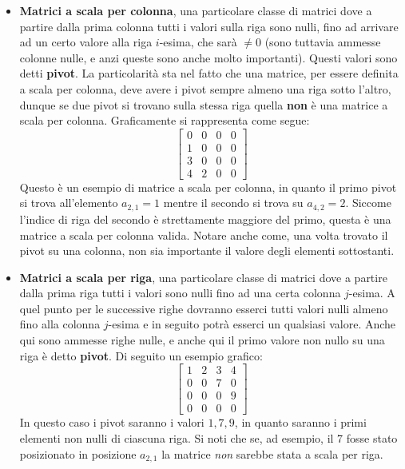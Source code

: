 \documentclass[12pt]{report}
\begin{document}
	\begin{itemize}
		\item \textbf{Matrici a scala per colonna}, una particolare classe di matrici dove a partire dalla prima colonna tutti i valori sulla riga sono nulli, fino ad arrivare ad un certo valore alla riga $i$-esima, che sarà $\neq 0$ (sono tuttavia ammesse colonne nulle, e anzi queste sono anche molto importanti). Questi valori sono detti \textbf{pivot}.
		La particolarità sta nel fatto che una matrice, per essere definita a scala per colonna, deve avere i pivot sempre almeno una riga sotto l'altro, dunque se due pivot si trovano sulla stessa riga quella \textbf{non} è una matrice a scala per colonna.
		Graficamente si rappresenta come segue:
		\[
			\begin{bmatrix}
				0 & 0 & 0 & 0\\
				1 & 0 & 0 & 0\\
				3 & 0 & 0 & 0\\
				4 & 2 & 0 & 0
			\end{bmatrix}
		\]
		Questo è un esempio di matrice a scala per colonna, in quanto il primo pivot si trova all'elemento $a_{2,1} = 1$ mentre il secondo si trova su $a_{4,2} = 2$. Siccome l'indice di riga del secondo è strettamente maggiore del primo, questa è una matrice a scala per colonna valida. Notare anche come, una volta trovato il pivot su una colonna, non sia importante il valore degli elementi sottostanti.
		
		\item \textbf{Matrici a scala per riga}, una particolare classe di matrici dove a partire dalla prima riga tutti i valori sono nulli fino ad una certa colonna $j$-esima. A quel punto per le successive righe dovranno esserci tutti valori nulli almeno fino alla colonna $j$-esima e in seguito potrà esserci un qualsiasi valore. Anche qui sono ammesse righe nulle, e anche qui il primo valore non nullo su una riga è detto \textbf{pivot}.
		Di seguito un esempio grafico:
		\[
			\begin{bmatrix}
				1 & 2 & 3 & 4\\
				0 & 0 & 7 & 0\\
				0 & 0 & 0 & 9\\
				0 & 0 & 0 & 0
			\end{bmatrix}
		\]
		In questo caso i pivot saranno i valori $1, 7, 9$, in quanto saranno i primi elementi non nulli di ciascuna riga. Si noti che se, ad esempio, il 7 fosse stato posizionato in posizione $a_{2,1}$ la matrice \textit{non} sarebbe stata a scala per riga.
		
	\end{itemize}
	
\end{document}
